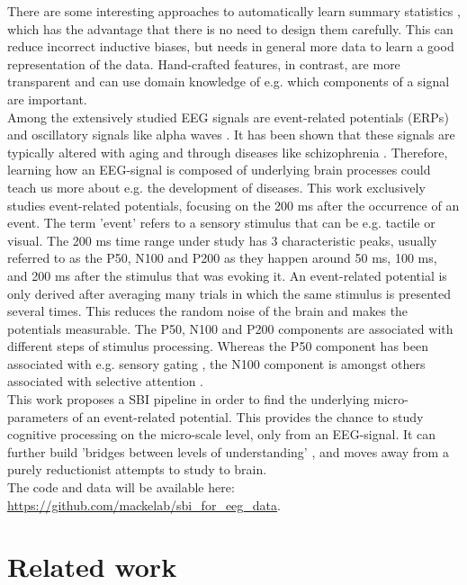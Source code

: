 \documentclass[12pt]{extreport}
\begin{document}
There are some interesting approaches to automatically learn summary statistics \citep{radev2020amortized, dyer2021deep, rodrigues_learning_2020}, which has the advantage that there is no need to design them carefully. This can reduce incorrect inductive biases, but needs in general more data to learn a good representation of the data. 
Hand-crafted features, in contrast, are more transparent and can use domain knowledge of e.g. which components of a signal are important.\\

Among the extensively studied EEG signals are event-related potentials (ERPs) and oscillatory signals like alpha waves \citep{ziegler2010transformations}. It has been shown that these signals are typically altered with aging \citep{ziegler2010transformations} and through diseases like schizophrenia \citep{hanlon2005distinct, hamilton2021abnormal}. Therefore, learning how an EEG-signal is composed of underlying brain processes could teach us more about e.g. the development of diseases.  
This work exclusively studies event-related potentials, focusing on the 200 ms after the occurrence of an event. The term 'event' refers to a sensory stimulus that can be e.g. tactile or visual. The 200 ms time range under study has 3 characteristic peaks, usually referred to as the P50, N100 and P200 as they happen around 50 ms, 100 ms, and 200 ms after the stimulus that was evoking it. An event-related potential is only derived after averaging many trials in which the same stimulus is presented several times. This reduces the random noise of the brain and makes the potentials measurable. The P50, N100 and P200 components are associated with different steps of stimulus processing. Whereas the P50 component has been associated with e.g. sensory gating \citep{cadenhead2000sensory}, the N100 component is amongst others associated with selective attention \citep{thornton2007selective}. \\

This work proposes a SBI pipeline in order to find the underlying micro-parameters of an event-related potential. This provides the chance to study cognitive processing on the micro-scale level, only from an EEG-signal. 
It can further build 'bridges between levels of understanding' \citep{dayan2005theoretical}, and moves away from a purely reductionist attempts to study to brain.\\
The code and data will be available here: \url{https://github.com/mackelab/sbi_for_eeg_data}.

\chapter{Related work}
\end{document}
